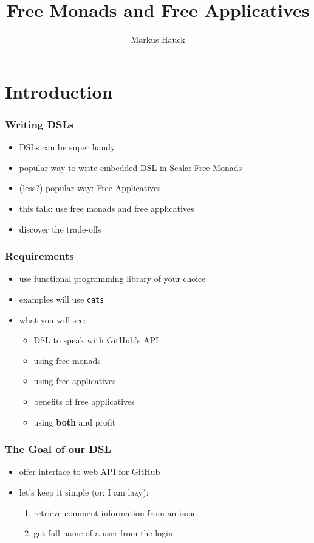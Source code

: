 \documentclass[compress]{beamer}
\title{Free Monads and Free Applicatives}
\author{Markus Hauck}
\begin{document}
\begin{frame}
  \titlepage{}
\end{frame}

\section{Introduction}
\label{sec:Introduction}

\begin{frame}
  \frametitle{Writing DSLs}
  \begin{itemize}
  \item DSLs can be super handy
  \item popular way to write embedded DSL in Scala: Free Monads
  \item (less?) popular way: Free Applicatives
  \item this talk: use free monads and free applicatives
  \item discover the trade-offs
  \end{itemize}
\end{frame}

\begin{frame}
  \frametitle{Requirements}
  \begin{itemize}
  \item use functional programming library of your choice
  \item examples will use \texttt{cats}
  \item what you will see:
    \begin{itemize}
    \item DSL to speak with GitHub's API
    \item using free monads
    \item using free applicatives
    \item benefits of free applicatives
    \item using \textbf{both} and profit
    \end{itemize}
  \end{itemize}
\end{frame}

\begin{frame}
  \frametitle{The Goal of our DSL}
  \begin{itemize}
  \item offer interface to web API for GitHub
  \item let's keep it simple (or: I am lazy):
    \begin{enumerate}
    \item retrieve comment information from an issue
    \item get full name of a user from the login
    \end{enumerate}
  \end{itemize}
\end{frame}
\end{document}
